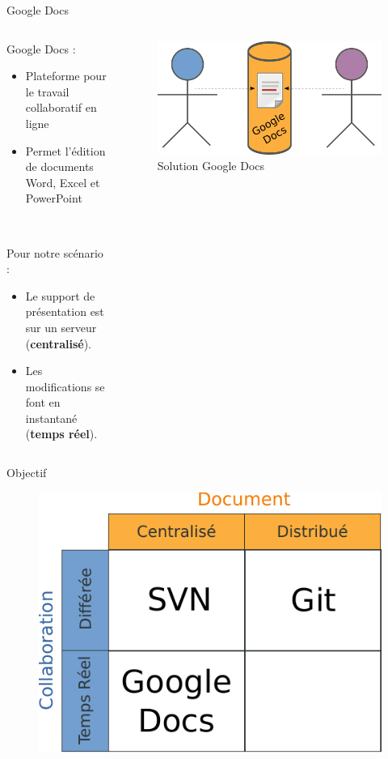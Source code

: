 \begin{frame}{Google Docs}
\begin{columns}
  \begin{column}{.5\textwidth}
  Google Docs :
  \begin{itemize}
    \item Plateforme pour le travail collaboratif en ligne
    \item Permet l'édition de documents Word, Excel et PowerPoint
  \end{itemize}~

  Pour notre scénario :
  \begin{itemize}
    \item Le support de présentation est sur un serveur (\textbf{centralisé}).
    \item Les modifications se font en instantané (\textbf{temps réel}).
  \end{itemize}
  \end{column}

  \begin{column}{.45\textwidth}
  \begin{figure}
    \center
    \includegraphics[width=.9\textwidth]{includes/gdocs.pdf}
    \caption{Solution Google Docs}
  \end{figure}
  \end{column}
\end{columns}
\end{frame}

\begin{frame}{Objectif}
  \begin{figure}
    \center
    \includegraphics[width=.7\textwidth]{includes/tab1.pdf}
  \end{figure}
\end{frame}

